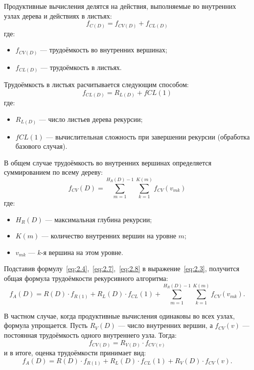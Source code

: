 Продуктивные вычисления делятся на действия, выполняемые во внутренних узлах дерева и действиях в листьях:
\begin{equation}
	f_{C(D)} = f_{CV(D)} + f_{CL(D)}
\end{equation}
где:
\begin{itemize}
	\item $f_{CV(D)}$ — трудоёмкость во внутренних вершинах;
	\item $f_{CL(D)}$ — трудоёмкость в листьях.
\end{itemize}

Трудоёмкость в листьях расчитывается следующим способом:
\begin{equation}
	f_{CL(D)} = R_{L(D)} + f{CL(1)}
	\label{eq:2.7}
\end{equation}
где:
\begin{itemize}
	\item $R_{L(D)} $ — число листьев дерева рекурсии;
	\item $f{CL(1)}$ — вычислительная сложность при завершении рекурсии (обработка базового случая).
\end{itemize}

В общем случае трудоёмкость во внутренних вершинах определяется суммированием по всему дереву:
\begin{equation}
	f_{CV}(D) = \sum_{m=1}^{H_R(D)-1} \sum_{k=1}^{K(m)} f_{CV}(v_{mk})
		\label{eq:2.8}
\end{equation}
где:
\begin{itemize}
	\item $H_R(D) $ — максимальная глубина рекурсии;
	\item $K(m)$ — количество внутренних вершин на уровне $m$;
	\item $v_{mk}$ — $k$-я вершина на этом уровне.
\end{itemize}

Подставив формулу \ref{eq:2.4}, \ref{eq:2.7}, \ref{eq:2.8} в выражение \ref{eq:2.3}, получится общая формула трудоёмкости рекурсивного алгоритма:
\begin{equation}
f_A(D) = R(D) \cdot f_{R(1)} + R_L(D) \cdot f_{CL}(1) + \sum_{m=1}^{H_R(D)-1} \sum_{k=1}^{K(m)} f_{CV}(v_{mk}).
\label{eq:2.9}
\end{equation}


В частном случае, когда продуктивные вычисления одинаковы во всех узлах, формула упрощается. Пусть $R_V(D)$ — число внутренних вершин, а $f_{CV}(v)$ — постоянная трудоёмкость одного внутреннего узла. Тогда:
\begin{equation}
	f_{CV(D)} = R_{V(D)} \cdot f_{CV(v)}
\end{equation}
и в итоге, оценка трудоёмкости принимает вид:
\begin{equation}
	f_A(D) = R(D) \cdot f_{R(1)} + R_L(D) \cdot f_{CL}(1) + R_V(D) \cdot f_{CV}(v).
\end{equation}



